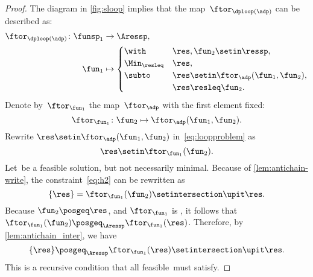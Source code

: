 \begin{proof}
    The diagram in \cref{fig:sloop} implies that the map~$\ftor_{\dploop(\adp)}$
    can be described as:
    \begin{align}
        \ftor_{\dploop(\adp)}\colon\funsp_{1} & \to\Aressp,\label{eq:loopproblem} \\
        \fun_{1}                              & \mapsto\begin{cases}
                                                           \with          & \res,\fun_{2}\setin\ressp,                 \\
                                                           \Min_{\resleq} & \res,                                      \\
                                                           \subto         & \res\setin\ftor_{\adp}(\fun_{1},\fun_{2}), \\
                                                                          & \res\resleq\fun_{2}.
                                                       \end{cases}
    \end{align}
    Denote by~$\ftor_{\fun_{1}}$ the map~$\ftor_{\adp}$ with the first element fixed:
    \begin{equation*}
        \ftor_{\fun_{1}}\colon\fun_{2}\mapsto\ftor_{\adp}(\fun_{1},\fun_{2}).
    \end{equation*}
    Rewrite $\res\setin\ftor_{\adp}(\fun_{1},\fun_{2})$ in~\cref{eq:loopproblem} as
    \begin{equation}
        \res\setin\ftor_{\fun_{1}}(\fun_{2}).
        \label{eq:h2}
    \end{equation}
    Let~\res be a feasible solution, but not necessarily minimal.
    Because of \cref{lem:antichain-write}, the constraint~\cref{eq:h2} can be rewritten as
    \begin{equation}
        \{\res\}=\ftor_{\fun_{1}}(\fun_{2})\setintersection\upit\res.
        \label{eq:h3}
    \end{equation}
    Because $\fun_{2}\posgeq\res$, and $\ftor_{\fun_{1}}$ is \scottcontinuous, it follows that~$\ftor_{\fun_{1}}(\fun_{2})\posgeq_{\Aressp}\ftor_{\fun_{1}}(\res)$.
    Therefore, by \cref{lem:antichain_inter}, we have
    \begin{equation}
        \{\res\}\posgeq_{\Aressp}\ftor_{\fun_{1}}(\res)\setintersection\upit\res.
        \label{eq:fea}
    \end{equation}
    This is a recursive condition that all feasible~\res must satisfy.


\end{proof}
